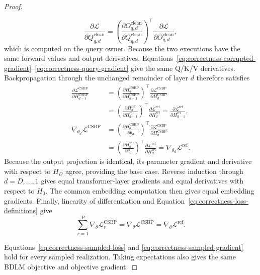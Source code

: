 \begin{proof}
\begin{enumerate}
\begin{equation}
    \frac{\partial \mathcal L}{\partial Q_{q,d}^{\mathrm{clean}}}
    = \left(
        \frac{\partial O_{q,d}^{\mathrm{clean}}}
             {\partial Q_{q,d}^{\mathrm{clean}}}
      \right)^{\!\top}
      \frac{\partial \mathcal L}{\partial O_{q,d}^{\mathrm{clean}}},
    \label{eq:correctness-query-gradient}
\end{equation}
which is computed on the query owner. Because the two executions have the same
forward values and output derivatives, Equations~\ref{eq:correctness-corrupted-gradient}--\ref{eq:correctness-query-gradient}
give the same Q/K/V derivatives. Backpropagation through the unchanged
remainder of layer $d$ therefore satisfies
\begin{equation}
    \begin{aligned}
      \frac{\partial \mathcal L^{\mathrm{CSBP}}}
           {\partial H_{d-1}^{\mathrm{CSBP}}}
      &=
      \left(
        \frac{\partial H_d^{\mathrm{CSBP}}}
             {\partial H_{d-1}^{\mathrm{CSBP}}}
      \right)^{\!\top}
      \frac{\partial \mathcal L^{\mathrm{CSBP}}}
           {\partial H_d^{\mathrm{CSBP}}} \\
      &=
      \left(
        \frac{\partial H_d^{\mathrm{ref}}}
             {\partial H_{d-1}^{\mathrm{ref}}}
      \right)^{\!\top}
      \frac{\partial \mathcal L^{\mathrm{ref}}}
           {\partial H_d^{\mathrm{ref}}}
      =
      \frac{\partial \mathcal L^{\mathrm{ref}}}
           {\partial H_{d-1}^{\mathrm{ref}}}, \\[4pt]
      \nabla_{\theta_d}\mathcal L^{\mathrm{CSBP}}
      &=
      \left(
        \frac{\partial H_d^{\mathrm{CSBP}}}{\partial \theta_d}
      \right)^{\!\top}
      \frac{\partial \mathcal L^{\mathrm{CSBP}}}
           {\partial H_d^{\mathrm{CSBP}}} \\
      &=
      \left(
        \frac{\partial H_d^{\mathrm{ref}}}{\partial \theta_d}
      \right)^{\!\top}
      \frac{\partial \mathcal L^{\mathrm{ref}}}
           {\partial H_d^{\mathrm{ref}}}
      =\nabla_{\theta_d}\mathcal L^{\mathrm{ref}}.
    \end{aligned}
    \label{eq:correctness-backward-step}
\end{equation}
Because the output projection is identical, its parameter gradient and
derivative with respect to $H_D$ agree, providing the base case. Reverse
induction through $d=D,\ldots,1$ gives equal transformer-layer gradients and
equal derivatives with respect to $H_0$. The common embedding computation then
gives equal embedding gradients. Finally, linearity of differentiation and
Equation~\ref{eq:correctness-loss-definitions} give
\begin{equation}
    \sum_{r=1}^{P}
    \nabla_\theta \mathcal L_r^{\mathrm{CSBP}}
    =\nabla_\theta \mathcal L^{\mathrm{CSBP}}
    =\nabla_\theta \mathcal L^{\mathrm{ref}}.
    \label{eq:correctness-sampled-gradient}
\end{equation}
\end{enumerate}
Equations~\ref{eq:correctness-sampled-loss} and
\ref{eq:correctness-sampled-gradient} hold for every sampled realization.
Taking expectations also gives the same BDLM objective and objective gradient.
\end{proof}

